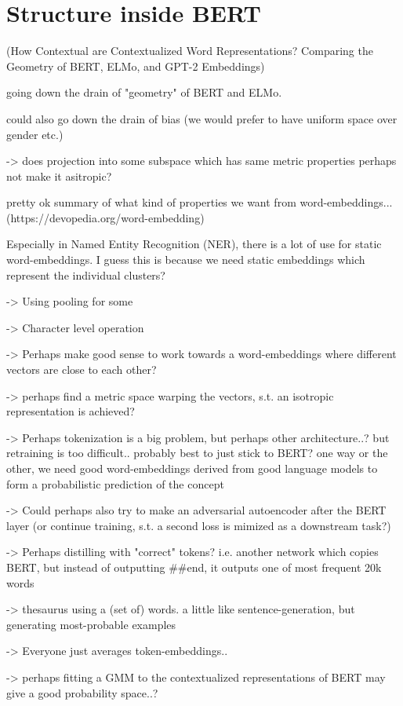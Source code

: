 \documentclass[a4paper,12pt,twoside,openright]{report}
\begin{document}
\section{Structure inside BERT}

(How Contextual are Contextualized Word Representations? Comparing the Geometry of BERT, ELMo, and GPT-2 Embeddings)

going down the drain of "geometry" of BERT and ELMo.

could also go down the drain of bias (we would prefer to have uniform space over gender etc.)

-> does projection into some subspace which has same metric properties perhaps not make it asitropic?

pretty ok summary of what kind of properties we want from word-embeddings... (https://devopedia.org/word-embedding)


Especially in Named Entity Recognition (NER), there is a lot of use for static word-embeddings.
I guess this is because we need static embeddings which represent the individual clusters?

-> Using pooling for some 

-> Character level operation

-> Perhaps make good sense to work towards a word-embeddings where different vectors are close to each other?

-> perhaps find a metric space warping the vectors, s.t. an isotropic representation is achieved?

-> Perhaps tokenization is a big problem, but perhaps other architecture..? but retraining is too difficult.. probably best to just stick to BERT? one way or the other, we need good word-embeddings derived from good language models to form a probabilistic prediction of the concept


-> Could perhaps also try to make an adversarial autoencoder after the BERT layer (or continue training, s.t. a second loss is mimized as a downstream task?)

-> Perhaps distilling with "correct" tokens? i.e. another network which copies BERT, but instead of outputting \#\#end, it outputs one of most frequent 20k words

-> thesaurus using a (set of) words. a little like sentence-generation, but generating most-probable examples

-> Everyone just averages token-embeddings..

-> perhaps fitting a GMM to the contextualized representations of BERT may give a good probability space..?
\end{document}

